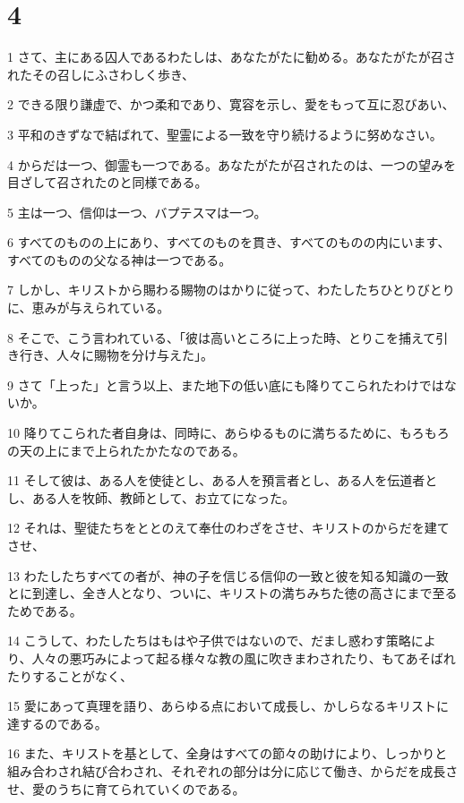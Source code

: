 \chapter{4}

\par 1 さて、主にある囚人であるわたしは、あなたがたに勧める。あなたがたが召されたその召しにふさわしく歩き、
\par 2 できる限り謙虚で、かつ柔和であり、寛容を示し、愛をもって互に忍びあい、
\par 3 平和のきずなで結ばれて、聖霊による一致を守り続けるように努めなさい。
\par 4 からだは一つ、御霊も一つである。あなたがたが召されたのは、一つの望みを目ざして召されたのと同様である。
\par 5 主は一つ、信仰は一つ、バプテスマは一つ。
\par 6 すべてのものの上にあり、すべてのものを貫き、すべてのものの内にいます、すべてのものの父なる神は一つである。
\par 7 しかし、キリストから賜わる賜物のはかりに従って、わたしたちひとりびとりに、恵みが与えられている。
\par 8 そこで、こう言われている、「彼は高いところに上った時、とりこを捕えて引き行き、人々に賜物を分け与えた」。
\par 9 さて「上った」と言う以上、また地下の低い底にも降りてこられたわけではないか。
\par 10 降りてこられた者自身は、同時に、あらゆるものに満ちるために、もろもろの天の上にまで上られたかたなのである。
\par 11 そして彼は、ある人を使徒とし、ある人を預言者とし、ある人を伝道者とし、ある人を牧師、教師として、お立てになった。
\par 12 それは、聖徒たちをととのえて奉仕のわざをさせ、キリストのからだを建てさせ、
\par 13 わたしたちすべての者が、神の子を信じる信仰の一致と彼を知る知識の一致とに到達し、全き人となり、ついに、キリストの満ちみちた徳の高さにまで至るためである。
\par 14 こうして、わたしたちはもはや子供ではないので、だまし惑わす策略により、人々の悪巧みによって起る様々な教の風に吹きまわされたり、もてあそばれたりすることがなく、
\par 15 愛にあって真理を語り、あらゆる点において成長し、かしらなるキリストに達するのである。
\par 16 また、キリストを基として、全身はすべての節々の助けにより、しっかりと組み合わされ結び合わされ、それぞれの部分は分に応じて働き、からだを成長させ、愛のうちに育てられていくのである。
